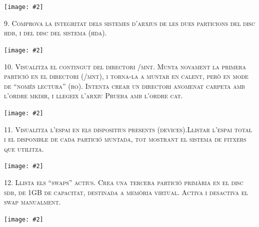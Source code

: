 \documentclass[a4paper,12pt]{article}
\newcommand{\mygraphic}[2][height=0.45\textheight]{\begin{center}
		\centering\texttt{[image: \#2]}\par
\end{center}}
\begin{document}
\mygraphic{imatges/8.png}

\newpage
\textsc{9. Comprova la integritat dels sistemes d'arxius de les dues particions del disc hdb, i del disc del sistema (hda).}

\mygraphic{imatges/9.png}

\newpage
\textsc{10. Visualitza el contingut del directori /mnt. Munta novament la primera partició en el directori (/mnt), i torna-la a muntar en calent, però en mode de “només lectura” (ro). Intenta crear un directori anomenat carpeta amb l'ordre mkdir, i llegeix l'arxiu Prueba amb l'ordre cat.}

\mygraphic{imatges/10.png}

\newpage
\textsc{11. Visualitza l'espai en els dispositius presents (devices).Llistar l'espai total i el disponible de cada partició muntada, tot mostrant el sistema de fitxers que utilitza.}

\mygraphic{imatges/11.png}

\newpage
\textsc{12. Llista els “swaps” actius. Crea una tercera partició primària en el disc sdb, de 1GB de capacitat, destinada a memòria virtual. Activa i desactiva el swap manualment.}

\mygraphic{imatges/12.png}
\end{document}
